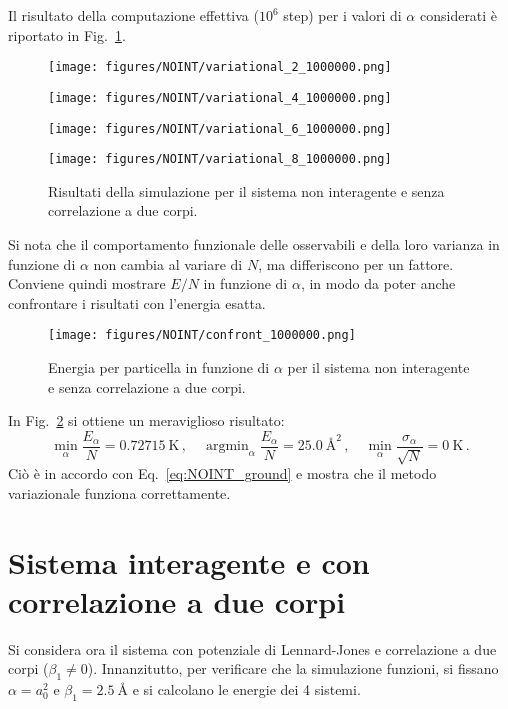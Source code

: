 \documentclass[a4paper, titlepage]{article}
\DeclareMathOperator*{\argmin}{argmin}
\begin{document}
Il risultato della computazione effettiva ($10^6$ step) per i valori di $\alpha$ considerati è riportato in Fig.\ \ref{fig:NOINT_var}.
\begin{figure}[h!]
    \centering
    \begin{minipage}{0.49 \textwidth}
        \centering
        \texttt{[image: figures/NOINT/variational\_2\_1000000.png]}
    \end{minipage}
    \begin{minipage}{0.49 \textwidth}
        \centering
        \texttt{[image: figures/NOINT/variational\_4\_1000000.png]}
    \end{minipage}
    \begin{minipage}{0.49 \textwidth}
        \centering
        \texttt{[image: figures/NOINT/variational\_6\_1000000.png]}
    \end{minipage}
    \begin{minipage}{0.49 \textwidth}
        \centering
        \texttt{[image: figures/NOINT/variational\_8\_1000000.png]}
    \end{minipage}
    \caption{Risultati della simulazione per il sistema non interagente e senza correlazione a due corpi.}
    \label{fig:NOINT_var}
\end{figure}
Si nota che il comportamento funzionale delle osservabili e della loro varianza in funzione di $\alpha$ non cambia al variare di $N$, ma differiscono per un fattore. Conviene quindi mostrare $E/N$ in funzione di $\alpha$, in modo da poter anche confrontare i risultati con l'energia esatta.
\begin{figure}[h!]
    \centering
    \texttt{[image: figures/NOINT/confront\_1000000.png]}
    \caption{Energia per particella in funzione di $\alpha$ per il sistema non interagente e senza correlazione a due corpi.}
    \label{fig:NOINT_confront}
\end{figure} 
In Fig.\ \ref{fig:NOINT_confront} si ottiene un meraviglioso risultato: 
\[
\min_\alpha\frac{E_\alpha}{N} = 0.72715\ \unit{\kelvin}\, , \quad \argmin_\alpha \frac{E_\alpha}{N} = 25.0\ \unit{\angstrom\squared}\, , \quad \min_\alpha \frac{\sigma_\alpha}{\sqrt{N}} = 0\ \unit{\kelvin}\, .
\]
Ciò è in accordo con Eq.\ \ref{eq:NOINT_ground} e mostra che il metodo variazionale funziona correttamente. 

\section{Sistema interagente e con correlazione a due corpi}
Si considera ora il sistema con potenziale di Lennard-Jones e correlazione a due corpi ($\beta_1 \neq 0$). Innanzitutto, per verificare che la simulazione funzioni, si fissano $\alpha = a_0^2$ e $\beta_1 = 2.5\ \unit{\angstrom}$ e si calcolano le energie dei 4 sistemi.
\end{document}
